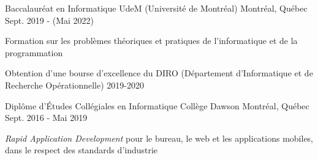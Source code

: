 

\begin{cventries}

  \cventry
    {Baccalauréat en Informatique} %
    {UdeM (Université de Montréal)} %
    {Montréal, Québec} %
    {Sept. 2019 - (Mai 2022)} %
    {
      \begin{cvitems} %
        \item {Formation sur les problèmes théoriques et pratiques de l'informatique et de la programmation}
        \item {Obtention d'une bourse d'excellence du DIRO (Département d'Informatique et de Recherche Opérationnelle) 2019-2020}
      \end{cvitems}
    }
  \cventry
    {Diplôme d'Études Collégiales en Informatique} %
    {Collège Dawson} %
    {Montréal, Québec} %
    {Sept. 2016 - Mai 2019} %
    {
      \begin{cvitems} %
        \item {\textit{Rapid Application Development} pour le bureau, le web et les applications mobiles, dans le respect des standards d'industrie}
      \end{cvitems}
    }

\end{cventries}
